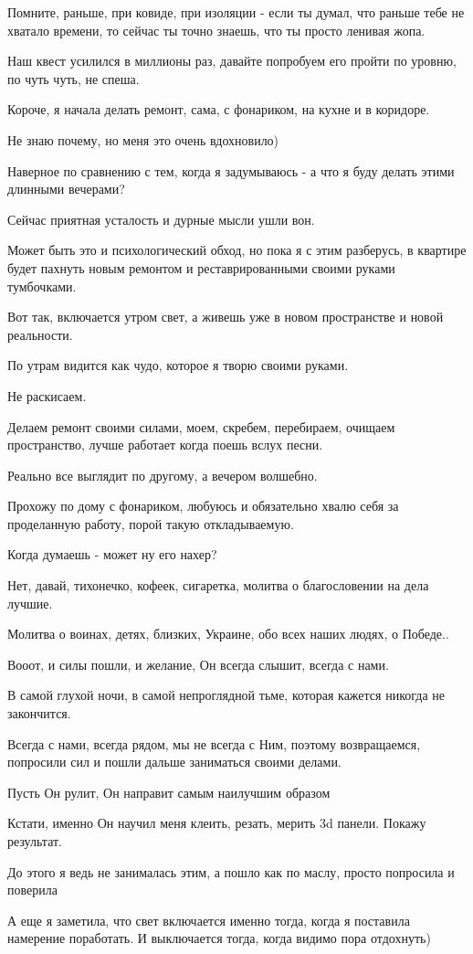 Помните, раньше, при ковиде, при изоляции - если ты думал, что раньше тебе не
хватало времени, то сейчас ты точно знаешь, что ты просто ленивая жопа.

Наш квест усилился в миллионы раз, давайте попробуем его пройти по уровню, по
чуть чуть, не спеша.

Короче, я начала делать ремонт, сама, с фонариком, на кухне и в коридоре.

Не знаю почему, но меня это очень вдохновило)

Наверное по сравнению с тем, когда я задумываюсь - а что я буду делать этими
длинными вечерами?

Сейчас приятная усталость и дурные мысли ушли вон.

Может быть это и психологический обход, но пока я с этим разберусь, в квартире
будет пахнуть новым ремонтом и реставрированными своими руками тумбочками.

Вот так, включается утром свет, а живешь уже в новом пространстве и новой
реальности.

По утрам видится как чудо, которое я творю своими руками.

Не раскисаем.

Делаем ремонт своими силами, моем, скребем, перебираем, очищаем пространство,
лучше работает когда поешь вслух песни.

Реально все выглядит по другому, а вечером волшебно.

Прохожу по дому с фонариком, любуюсь и обязательно хвалю себя за проделанную
работу, порой такую откладываемую.

Когда думаешь - может ну его нахер?

Нет, давай, тихонечко, кофеек, сигаретка, молитва о благословении на дела
лучшие.

Молитва о воинах, детях, близких, Украине, обо всех наших людях, о Победе..

Вооот, и силы пошли, и желание,  Он всегда слышит, всегда с нами. 

В самой глухой ночи, в самой непроглядной тьме, которая кажется никогда не
закончится.

Всегда с нами, всегда рядом, мы не всегда с Ним, поэтому возвращаемся,
попросили сил и пошли дальше заниматься своими делами.

Пусть Он рулит, Он направит самым наилучшим образом 🙏🏻🇺🇦💛💙🇺🇦

Кстати, именно Он научил меня клеить, резать, мерить 3d панели. Покажу
результат.

До этого я ведь не занималась этим, а пошло как по маслу, просто попросила и
поверила 🙏🏻

А еще я заметила, что свет включается именно тогда, когда я поставила намерение
поработать. И выключается тогда, когда видимо пора отдохнуть)
